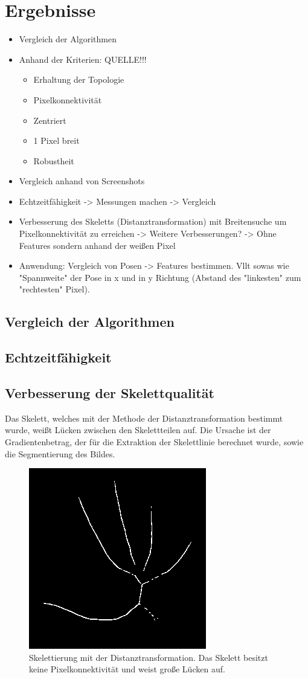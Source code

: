 \chapter{Ergebnisse}
\begin{itemize}
	\item Vergleich der Algorithmen
	\item Anhand der Kriterien: QUELLE!!!
	\begin{itemize}
		\item Erhaltung der Topologie
		\item Pixelkonnektivität
		\item Zentriert
		\item 1 Pixel breit
		\item Robustheit
	\end{itemize}
	\item Vergleich anhand von Screenshots
	\item Echtzeitfähigkeit -> Messungen machen -> Vergleich
	\item Verbesserung des Skeletts (Distanztransformation) mit Breitensuche um Pixelkonnektivität zu erreichen -> Weitere Verbesserungen? -> Ohne Features sondern anhand der weißen Pixel
	\item Anwendung: Vergleich von Posen -> Features bestimmen. Vllt sowas wie "Spannweite" der Pose in x und in y Richtung (Abstand des "linkesten" zum "rechtesten" Pixel). 
\end{itemize}
\section{Vergleich der Algorithmen}
\section{Echtzeitfähigkeit}
\section{Verbesserung der Skelettqualität}
Das Skelett, welches mit der Methode der Distanztransformation bestimmt wurde, weißt Lücken zwischen den Skelettteilen auf. Die Ursache ist der Gradientenbetrag, der für die Extraktion der Skelettlinie berechnet wurde, sowie die Segmentierung des Bildes. 
\begin{figure}
\centering
\includegraphics[width=0.4\linewidth]{./fig/hand-skelett}
\caption{Skelettierung mit der Distanztransformation. Das Skelett besitzt keine Pixelkonnektivität und weist große Lücken auf.}
\label{fig:hand-skelett}
\end{figure}
